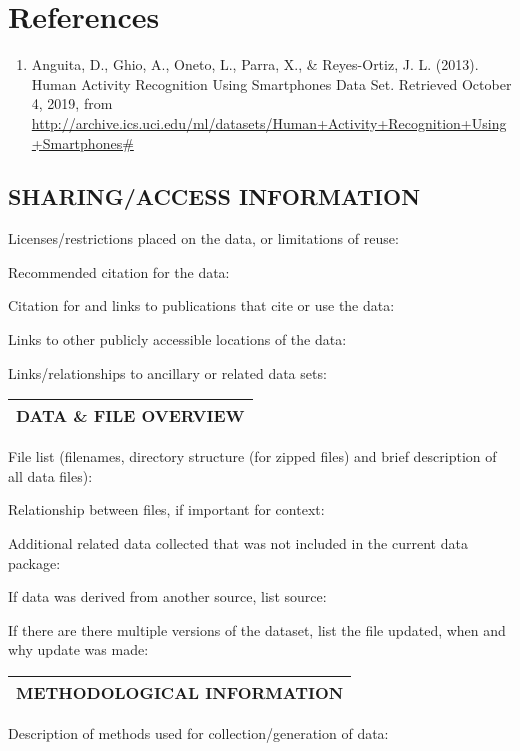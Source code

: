 \documentclass[]{article}
\providecommand{\tightlist}{%
  \setlength{\itemsep}{0pt}\setlength{\parskip}{0pt}}
\begin{document}
\section{References}\label{references}

\begin{enumerate}
\def\labelenumi{\arabic{enumi}.}
\tightlist
\item
  Anguita, D., Ghio, A., Oneto, L., Parra, X., \& Reyes-Ortiz, J. L.
  (2013). Human Activity Recognition Using Smartphones Data Set.
  Retrieved October 4, 2019, from
  \url{http://archive.ics.uci.edu/ml/datasets/Human+Activity+Recognition+Using+Smartphones\#}
\end{enumerate}

\subsection{SHARING/ACCESS INFORMATION}\label{sharingaccess-information}

Licenses/restrictions placed on the data, or limitations of reuse:

Recommended citation for the data:

Citation for and links to publications that cite or use the data:

Links to other publicly accessible locations of the data:

Links/relationships to ancillary or related data sets:

\begin{longtable}[]{@{}l@{}}
\toprule
DATA \& FILE OVERVIEW\tabularnewline
\bottomrule
\end{longtable}

File list (filenames, directory structure (for zipped files) and brief
description of all data files):

Relationship between files, if important for context:

Additional related data collected that was not included in the current
data package:

If data was derived from another source, list source:

If there are there multiple versions of the dataset, list the file
updated, when and why update was made:

\begin{longtable}[]{@{}l@{}}
\toprule
METHODOLOGICAL INFORMATION\tabularnewline
\bottomrule
\end{longtable}

Description of methods used for collection/generation of data:
\end{document}
